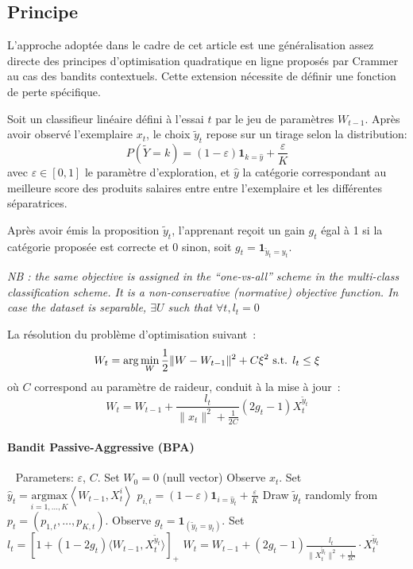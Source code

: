 \documentclass[preprint,12pt,authoryear]{elsarticle}
\begin{document}
  


\subsection{Principe}
L'approche adoptée dans le cadre de cet article est une généralisation assez directe des principes d'optimisation quadratique en ligne proposés par Crammer au cas des bandits contextuels. Cette extension nécessite de définir une fonction de perte spécifique. 

Soit un classifieur linéaire défini à l'essai $t$ par le jeu de paramètres $W_{t-1}$. Après avoir observé l'exemplaire $x_t$, le choix $\tilde{y}_t$ repose sur un tirage selon la distribution: $$P(\tilde{Y}=k) = (1 - \varepsilon) \mathbf{1}_{k = \hat{y}} + \frac{\varepsilon}{K} $$ avec $\varepsilon \in [0,1]$ le paramètre d'exploration, et $\hat{y}$ la catégorie correspondant au meilleure score des produits salaires entre entre l'exemplaire et les différentes séparatrices.  

Après avoir émis la proposition $\tilde{y}_t$, l'apprenant reçoit un gain $g_t$ égal à 1 si la catégorie proposée est correcte et 0 sinon, soit $g_t = \mathbf{1}_{\tilde{y}_t=y_t}$. 



\emph{NB : the same objective is assigned in the ``one-vs-all'' scheme in the multi-class classification scheme. It is a non-conservative (normative) objective function. In case the dataset is separable, $\exists U$ such that $\forall t, l_t = 0$  }

La résolution du problème d'optimisation suivant~:
$$W_{t} = \arg \min_W \frac{1}{2} \| W - W_{t-1}\|^2 + C \xi^2 \hbox{ s.t. } l_t \leq \xi$$
où $C$ correspond au paramètre de raideur, conduit à la mise à jour~:
$$W_{t} =  W_{t-1} + \frac{l_t}{\|x_t\|^2 + \frac{1}{2C}} (2g_t - 1) X_t^{\tilde{y}_t}$$

\paragraph{Bandit Passive-Aggressive (BPA)}
\begin{algorithmic}
	\STATE $\ \ $
	\STATE Parameters:  $\varepsilon$, $C$.
	\STATE Set $W_0 = 0$ (null vector)
	\STATE Observe $x_t$.
	\STATE Set $\hat{y}_t = \underset{i = 1,\dots,K}{\text{argmax}}\left\langle W_{t-1} ,X_t^i\right\rangle$
	\STATE $p_{i,t}= (1-\varepsilon)\mathbf{1}_{i = \hat{y}_t} + \frac{\varepsilon}{K}$
	\ENDFOR
	\STATE Draw $\tilde{y}_t$ randomly from $p_t = \left(p_{1,t},\dots ,p_{K,t}\right)$.
	\STATE Observe $g_t = \mathbf{1}_{(\tilde{y}_t=y_t)}$.
	\STATE Set $l_t = \left[ 1+(1-2g_t)\langle W_{t-1},X_t^{\tilde{y}_t}\rangle\right]_{+}$ 
	\STATE $W_t = W_{t-1} + (2g_t-1)\frac{l_t}{\parallel X_t^{\tilde{y}_t}\parallel^2 + \frac{1}{2C}}\cdot X_t^{\tilde{y}_t}$
	\ENDFOR
\end{algorithmic}
\end{document}
